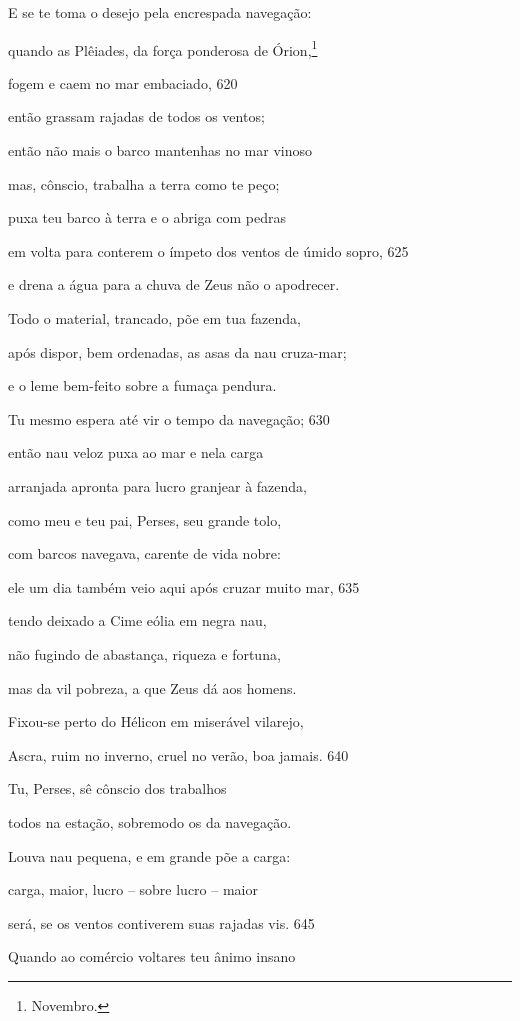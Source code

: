 E se te toma o desejo pela encrespada navegação:

quando as Plêiades, da força ponderosa de Órion,\footnote{Novembro.}

fogem e caem no mar embaciado, \num{620}

então grassam rajadas de todos os ventos;

então não mais o barco mantenhas no mar vinoso

mas, cônscio, trabalha a terra como te peço;

puxa teu barco à terra e o abriga com pedras

em volta para conterem o ímpeto dos ventos de úmido sopro, \num{625}

e drena a água para a chuva de Zeus não o apodrecer.

Todo o material, trancado, põe em tua fazenda,

após dispor, bem ordenadas, as asas da nau cruza-mar;

e o leme bem-feito sobre a fumaça pendura.

Tu mesmo espera até vir o tempo da navegação; \num{630}

então nau veloz puxa ao mar e nela carga

arranjada apronta para lucro granjear à fazenda,

como meu e teu pai, Perses, seu grande tolo,

com barcos navegava, carente de vida nobre:

ele um dia também veio aqui após cruzar muito mar, \num{635}

tendo deixado a Cime eólia em negra nau,

não fugindo de abastança, riqueza e fortuna,

mas da vil pobreza, a que Zeus dá aos homens.

Fixou-se perto do Hélicon em miserável vilarejo,

Ascra, ruim no inverno, cruel no verão, boa jamais. \num{640}

Tu, Perses, sê cônscio dos trabalhos

todos na estação, sobremodo os da navegação.

Louva nau pequena, e em grande põe a carga:

carga, maior, lucro -- sobre lucro -- maior

será, se os ventos contiverem suas rajadas vis. \num{645}

Quando ao comércio voltares teu ânimo insano

